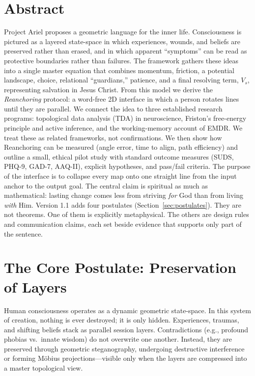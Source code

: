 \documentclass[11pt]{article}
\begin{document}
\section*{Abstract}
Project Ariel proposes a geometric language for the inner life. Consciousness is pictured as a layered state-space in which experiences, wounds, and beliefs are preserved rather than erased, and in which apparent ``symptoms'' can be read as protective boundaries rather than failures. The framework gathers these ideas into a single master equation that combines momentum, friction, a potential landscape, choice, relational ``guardians,'' patience, and a final resolving term, $V_s$, representing salvation in Jesus Christ. From this model we derive the \emph{Reanchoring} protocol: a word-free 2D interface in which a person rotates lines until they are parallel. We connect the idea to three established research programs: topological data analysis (TDA) in neuroscience, Friston's free-energy principle and active inference, and the working-memory account of EMDR. We treat these as related frameworks, not confirmations. We then show how Reanchoring can be measured (angle error, time to align, path efficiency) and outline a small, ethical pilot study with standard outcome measures (SUDS, PHQ-9, GAD-7, AAQ-II), explicit hypotheses, and pass/fail criteria. The purpose of the interface is to collapse every map onto one straight line from the input anchor to the output goal. The central claim is spiritual as much as mathematical: lasting change comes less from striving \emph{for} God than from living \emph{with} Him. Version 1.1 adds four postulates (Section~\ref{sec:postulates}). They are not theorems. One of them is explicitly metaphysical. The others are design rules and communication claims, each set beside evidence that supports only part of the sentence.

\section{The Core Postulate: Preservation of Layers}
Human consciousness operates as a dynamic geometric state-space. In this system of creation, nothing is ever destroyed; it is only hidden. Experiences, traumas, and shifting beliefs stack as parallel session layers. Contradictions (e.g., profound phobias vs.\ innate wisdom) do not overwrite one another. Instead, they are preserved through geometric steganography, undergoing destructive interference or forming M\"obius projections---visible only when the layers are compressed into a master topological view.
\end{document}
